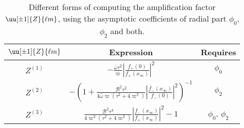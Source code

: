 \begin{table}[h]
	\centering
	\tabulinesep=1.5mm
    \begin{tabu}{@{\hskip 0.25cm}c@{\hskip 0.75cm}c@{\hskip 0.75cm}c@{\hskip 0.25cm}}
        \hline
        $\uu[\pm 1]{Z}{\ell m}$ & Expression & Requires \\
		\hline\hline
		$Z^{(1)}$
		& $-\frac{\bar{\omega} \tau^2}{\varpi} \left|\frac{f_{+}(0)}{f_{+}(x_\infty)}\right|^2$
		& $\phi_0$  \\
		\hline
		$Z^{(2)}$
		& $-\left( 1 + \frac{\mathscr{B}^2 \tau^2}{4 \bar{\omega} \varpi(\tau^2 + 4 \varpi^2)} \left|\frac{f_{-}(x_\infty)}{f_{-}(0)}\right|^2 \right)^{-1}$
		& $\phi_2$ \\
		\hline
		$Z^{(3)}$
		& $\frac{\mathscr{B}^2 \tau^4 }{4 \varpi^2 (\tau^2 + 4 \varpi^2)} \left| \frac{f_{-}(x_\infty)}{f_{+}(x_\infty)} \right|^2 - 1$
		& $\phi_0$, $\phi_2$ \\
        \hline
    \end{tabu}
    \caption{Different forms of computing the amplification factor $\uu[\pm 1]{Z}{\ell m}$, using the asymptotic coefficients of radial part $\phi_0$, $\phi_2$ and both.}
    \label{tb4:diferentsZs}
\end{table}